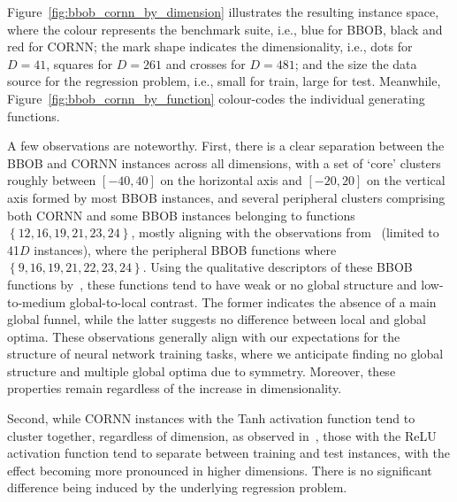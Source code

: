 \documentclass[acmsmall,screen,review,anonymous]{acmart}
\begin{document}
Figure~\ref{fig:bbob_cornn_by_dimension} illustrates the resulting instance space, where the colour represents the benchmark suite, i.e., blue for BBOB, black and red for CORNN; the mark shape indicates the dimensionality, i.e., dots for $D=41$, squares for $D=261$ and crosses for $D=481$; and the size the data source for the regression problem, i.e., small for train, large for test. Meanwhile, Figure~\ref{fig:bbob_cornn_by_function} colour-codes the individual generating functions.

A few observations are noteworthy. First, there is a clear separation between the BBOB and CORNN instances across all dimensions, with a set of `core' clusters roughly between $\left[-40,40\right]$ on the horizontal axis and $[-20,20]$ on the vertical axis formed by most BBOB instances, and several peripheral clusters comprising both CORNN and some BBOB instances belonging to functions $\left\{12,16,19,21,23,24\right\}$, mostly aligning with the observations from~\cite{Malan2025} (limited to 41$D$ instances), where the peripheral BBOB functions where $\left\{9, 16, 19, 21, 22, 23, 24\right\}$. Using the qualitative descriptors of these BBOB functions by~\citet{Mersmann2010}, these functions tend to have weak or no global structure and low-to-medium global-to-local contrast. The former indicates the absence of a main global funnel, while the latter suggests no difference between local and global optima. These observations generally align with our expectations for the structure of neural network training tasks, where we anticipate finding no global structure and multiple global optima due to symmetry. Moreover, these properties remain regardless of the increase in dimensionality.

Second, while CORNN instances with the Tanh activation function tend to cluster together, regardless of dimension, as observed in~\cite{Malan2025}, those with the ReLU activation function tend to separate between training and test instances, with the effect becoming more pronounced in higher dimensions. There is no significant difference being induced by the underlying regression problem. 
\end{document}

